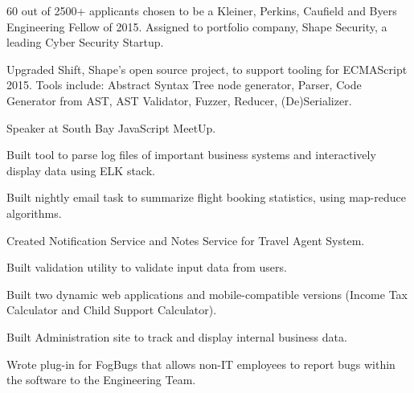 \documentclass[letterpaper]{deedy-resume} %
\begin{document}
\begin{minipage}[t]{0.66\textwidth}
\sectionspace %



\begin{tightitemize}
\item 60 out of 2500+ applicants chosen to be a Kleiner, Perkins, Caufield and Byers Engineering Fellow of 2015. Assigned to portfolio company, Shape Security, a leading Cyber Security Startup.
\item Upgraded Shift, Shape's open source project, to support tooling for ECMAScript 2015. Tools include: Abstract Syntax Tree node generator, Parser, Code Generator from AST, AST Validator, Fuzzer, Reducer, (De)Serializer.
\item Speaker at South Bay JavaScript MeetUp.
\end{tightitemize}

\sectionspace %



\begin{tightitemize}
\item Built tool to parse log files of important business systems and interactively display data using ELK stack.
\item Built nightly email task to summarize flight booking statistics, using map-reduce algorithms.
\item Created Notification Service and Notes Service for Travel Agent System.
\item Built validation utility to validate input data from users.
\end{tightitemize}

\sectionspace %



\begin{tightitemize}
\item Built two dynamic web applications and mobile-compatible versions (Income Tax Calculator and Child Support Calculator).
\item Built Administration site to track and display internal business data.
\item Wrote plug-in for FogBugs that allows non-IT employees to report bugs within the software to the Engineering Team.
\end{tightitemize}


\end{minipage}
\end{document}
